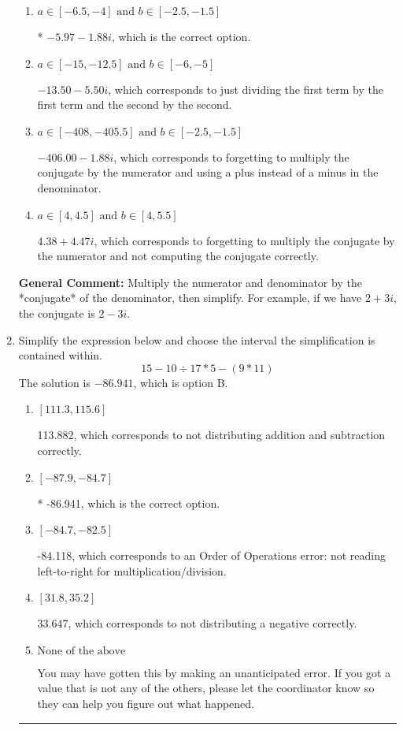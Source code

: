 \documentclass{extbook}[14pt]
\newcommand{\litem}[1]{\item #1

\rule{\textwidth}{0.4pt}}
\begin{document}
\begin{enumerate}
{\begin{enumerate}[label=\Alph*.]
 $-5.97  - 128.00 i$, which corresponds to forgetting to multiply the conjugate by the numerator.
\item \( a \in [-6.5, -4] \text{ and } b \in [-2.5, -1.5] \)

* $-5.97  - 1.88 i$, which is the correct option.
\item \( a \in [-15, -12.5] \text{ and } b \in [-6, -5] \)

 $-13.50  - 5.50 i$, which corresponds to just dividing the first term by the first term and the second by the second.
\item \( a \in [-408, -405.5] \text{ and } b \in [-2.5, -1.5] \)

 $-406.00  - 1.88 i$, which corresponds to forgetting to multiply the conjugate by the numerator and using a plus instead of a minus in the denominator.
\item \( a \in [4, 4.5] \text{ and } b \in [4, 5.5] \)

 $4.38  + 4.47 i$, which corresponds to forgetting to multiply the conjugate by the numerator and not computing the conjugate correctly.
\end{enumerate}

\textbf{General Comment:} Multiply the numerator and denominator by the *conjugate* of the denominator, then simplify. For example, if we have $2+3i$, the conjugate is $2-3i$.
}
\litem{
Simplify the expression below and choose the interval the simplification is contained within.
\[ 15 - 10 \div 17 * 5 - (9 * 11) \]The solution is \( -86.941 \), which is option B.\begin{enumerate}[label=\Alph*.]
\item \( [111.3, 115.6] \)

 113.882, which corresponds to not distributing addition and subtraction correctly.
\item \( [-87.9, -84.7] \)

* -86.941, which is the correct option.
\item \( [-84.7, -82.5] \)

 -84.118, which corresponds to an Order of Operations error: not reading left-to-right for multiplication/division.
\item \( [31.8, 35.2] \)

 33.647, which corresponds to not distributing a negative correctly.
\item \( \text{None of the above} \)

 You may have gotten this by making an unanticipated error. If you got a value that is not any of the others, please let the coordinator know so they can help you figure out what happened.
\end{enumerate}

}
\end{enumerate}
\end{document}

